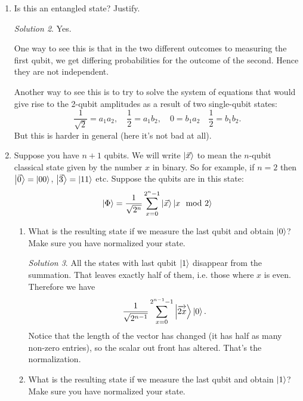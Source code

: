 \documentclass{article}
\theoremstyle{plain}
\theoremstyle{definition}
\theoremstyle{remark}
\newtheorem*{solution}{Solution}
\numberwithin{theorem}{section}
\begin{document}
\begin{enumerate}
\begin{enumerate}
\begin{solution}
				We have probability $1$ that we obtain $11$.
				\end{solution}

		\end{enumerate}
	\item Is this an entangled state?  Justify.

		\begin{solution}

		Yes.

		One way to see this is that in the two different outcomes to measuring the first qubit, we get differing probabilities for the outcome of the second.  Hence they are not independent.

		Another way to see this is to try to solve the system of equations that would give rise to the 2-qubit amplitudes as a result of two single-qubit states:
		\[
			\frac{1}{\sqrt{2}} = a_1a_2, \quad \frac{1}{2} = a_1b_2, \quad 0 = b_1a_2 \quad \frac{1}{2} = b_1b_2.
		\]
		But this is harder in general (here it's not bad at all).
		\end{solution}


\item 	Suppose you have $n+1$ qubits.  We will write $\ket{\vec{x}}$ to mean the $n$-qubit classical state given by the number $x$ in binary.  So for example, if $n=2$ then $\ket{\vec{0}} = \ket{00}$, $\ket{\vec{3}} = \ket{11}$ etc.  Suppose the qubits are in this state:
		\[
			\ket{\Phi} =	\frac{1}{\sqrt{2^n}} \sum_{x=0}^{2^n-1} \ket{\vec{x}}\ket{x \mod 2}
		\]

\begin{enumerate}
	\item What is the resulting state if we measure the last qubit and obtain $\ket{0}$?  Make sure you have normalized your state.

		\begin{solution}

		All the states with last qubit $\ket{1}$ disappear from the summation.  That leaves exactly half of them, i.e. those where $x$ is even.  Therefore we have
\[
	\frac{1}{\sqrt{2^{n-1}}} \sum_{x=0}^{2^{n-1}-1} \ket{\overrightarrow{2x}}\ket{0}.
		\]
 Notice that the length of the vector has changed (it has half as many non-zero entries), so the scalar out front has altered.  That's the normalization.
		\end{solution}


	\item What is the resulting state if we measure the last qubit and obtain $\ket{1}$?  Make sure you have normalized your state.


\end{enumerate}
\end{enumerate}
\end{document}

